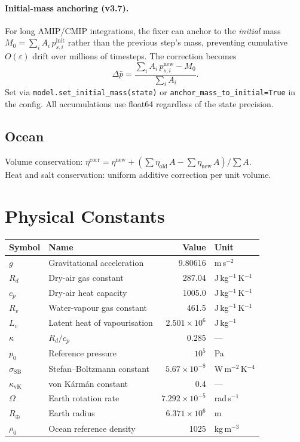 \documentclass[11pt,a4paper]{article}
\newcommand{\Rd}{R_d}
\newcommand{\cpd}{c_p}
\newcommand{\Lv}{L_v}
\newcommand{\Rv}{R_v}
\newcommand{\pref}{p_0}
\newcommand{\SB}{\sigma_{\mathrm{SB}}}
\begin{document}
\paragraph{Initial-mass anchoring (v3.7).}
For long AMIP/CMIP integrations, the fixer can anchor to the \emph{initial} mass $M_0=\sum_i A_i\,p_{s,i}^{\mathrm{init}}$ rather than the previous step's mass, preventing cumulative $O(\varepsilon)$ drift over millions of timesteps.  The correction becomes
\begin{equation}
  \Delta\bar p = \frac{\sum_i A_i\,p_{s,i}^{\mathrm{new}} - M_0}{\sum_i A_i}.
\end{equation}
Set via \texttt{model.set\_initial\_mass(state)} or \texttt{anchor\_mass\_to\_initial=True} in the config.  All accumulations use float64 regardless of the state precision.

\subsection{Ocean}
Volume conservation: $\eta^{\mathrm{corr}}=\eta^{\mathrm{new}}+(\sum\eta_{\mathrm{old}}\,A-\sum\eta_{\mathrm{new}}\,A)/\sum A$.\\
Heat and salt conservation: uniform additive correction per unit volume.

\section{Physical Constants}

\begin{center}
\begin{tabular}{llrl}
\toprule
Symbol & Name & Value & Unit \\
\midrule
$g$ & Gravitational acceleration & 9.80616 & m\,s$^{-2}$ \\
$\Rd$ & Dry-air gas constant & 287.04 & J\,kg$^{-1}$\,K$^{-1}$ \\
$\cpd$ & Dry-air heat capacity & 1005.0 & J\,kg$^{-1}$\,K$^{-1}$ \\
$\Rv$ & Water-vapour gas constant & 461.5 & J\,kg$^{-1}$\,K$^{-1}$ \\
$\Lv$ & Latent heat of vapourisation & $2.501\times10^6$ & J\,kg$^{-1}$ \\
$\kappa$ & $\Rd/\cpd$ & 0.285 & --- \\
$\pref$ & Reference pressure & $10^5$ & Pa \\
$\SB$ & Stefan--Boltzmann constant & $5.67\times10^{-8}$ & W\,m$^{-2}$\,K$^{-4}$ \\
$\kappa_{\mathrm{vK}}$ & von K\'arm\'an constant & 0.4 & --- \\
$\Omega$ & Earth rotation rate & $7.292\times10^{-5}$ & rad\,s$^{-1}$ \\
$R_{\oplus}$ & Earth radius & $6.371\times10^6$ & m \\
$\rho_0$ & Ocean reference density & 1025 & kg\,m$^{-3}$ \\
\bottomrule
\end{tabular}
\end{center}
\end{document}
